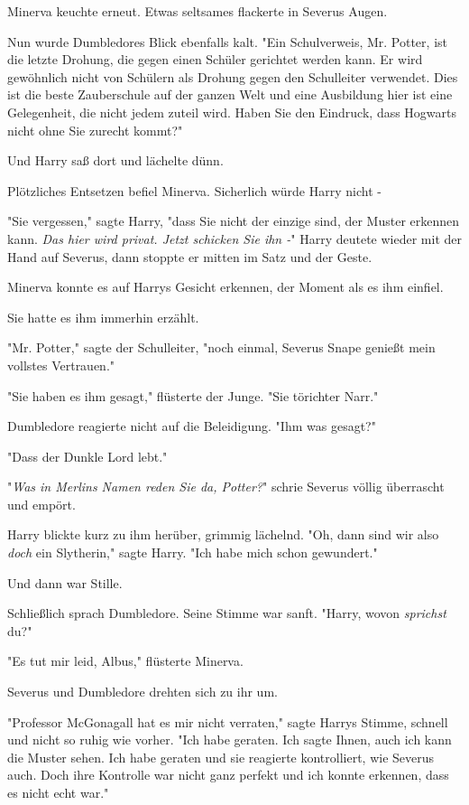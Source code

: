 {Minerva keuchte erneut. Etwas seltsames flackerte in Severus Augen.

Nun wurde Dumbledores Blick ebenfalls kalt. "Ein Schulverweis, Mr. Potter, ist die letzte Drohung, die gegen einen Schüler gerichtet werden kann. Er wird gewöhnlich nicht von Schülern als Drohung gegen den Schulleiter verwendet. Dies ist die beste Zauberschule auf der ganzen Welt und eine Ausbildung hier ist eine Gelegenheit, die nicht jedem zuteil wird. Haben Sie den Eindruck, dass Hogwarts nicht ohne Sie zurecht kommt?"

Und Harry saß dort und lächelte dünn.

Plötzliches Entsetzen befiel Minerva. Sicherlich würde Harry nicht -

"Sie vergessen," sagte Harry, "dass Sie nicht der einzige sind, der Muster erkennen kann. \emph{Das hier wird privat. Jetzt schicken Sie ihn -}" Harry deutete wieder mit der Hand auf Severus, dann stoppte er mitten im Satz und der Geste.

Minerva konnte es auf Harrys Gesicht erkennen, der Moment als es ihm einfiel.

Sie hatte es ihm immerhin erzählt.

"Mr. Potter," sagte der Schulleiter, "noch einmal, Severus Snape genießt mein vollstes Vertrauen."

"Sie haben es ihm gesagt," flüsterte der Junge. "Sie törichter Narr."

Dumbledore reagierte nicht auf die Beleidigung. "Ihm was gesagt?"

"Dass der Dunkle Lord lebt."

"\emph{Was in Merlins Namen reden Sie da, Potter?}" schrie Severus völlig überrascht und empört.

Harry blickte kurz zu ihm herüber, grimmig lächelnd. "Oh, dann sind wir also \emph{doch} ein Slytherin," sagte Harry. "Ich habe mich schon gewundert."

Und dann war Stille.

Schließlich sprach Dumbledore. Seine Stimme war sanft. "Harry, wovon \emph{sprichst} du?"

"Es tut mir leid, Albus," flüsterte Minerva.

Severus und Dumbledore drehten sich zu ihr um.

"Professor McGonagall hat es mir nicht verraten," sagte Harrys Stimme, schnell und nicht so ruhig wie vorher. "Ich habe geraten. Ich sagte Ihnen, auch ich kann die Muster sehen. Ich habe geraten und sie reagierte kontrolliert, wie Severus auch. Doch ihre Kontrolle war nicht ganz perfekt und ich konnte erkennen, dass es nicht echt war."

}
